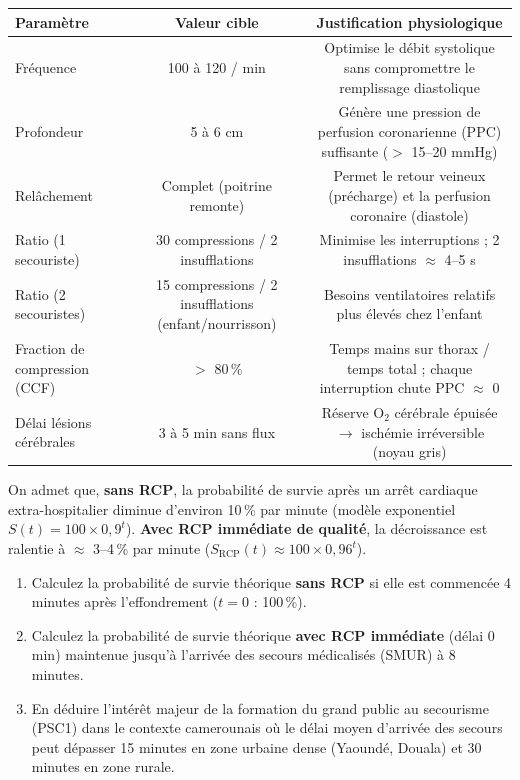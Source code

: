 \documentclass[11pt]{article}
\begin{document}
\begin{aretenir}
\begin{center}
\begin{tabular}{|l|c|c|}
\hline
\textbf{Paramètre} & \textbf{Valeur cible} & \textbf{Justification physiologique} \\
\hline
Fréquence & 100 à 120 / min & Optimise le débit systolique sans compromettre le remplissage diastolique \\
\hline
Profondeur & 5 à 6 cm & Génère une pression de perfusion coronarienne (PPC) suffisante ($>$ 15--20 mmHg) \\
\hline
Relâchement & Complet (poitrine remonte) & Permet le retour veineux (précharge) et la perfusion coronaire (diastole) \\
\hline
Ratio (1 secouriste) & 30 compressions / 2 insufflations & Minimise les interruptions ; 2 insufflations $\approx$ 4--5 s \\
\hline
Ratio (2 secouristes) & 15 compressions / 2 insufflations (enfant/nourrisson) & Besoins ventilatoires relatifs plus élevés chez l'enfant \\
\hline
Fraction de compression (CCF) & $>$ 80\,\% & Temps mains sur thorax / temps total ; chaque interruption chute PPC $\approx$ 0 \\
\hline
Délai lésions cérébrales & 3 à 5 min sans flux & Réserve O$_2$ cérébrale épuisée $\rightarrow$ ischémie irréversible (noyau gris) \\
\hline
\end{tabular}
\end{center}
\end{aretenir}

\begin{exercice}
On admet que, \textbf{sans RCP}, la probabilité de survie après un arrêt cardiaque extra-hospitalier diminue d'environ 10\,\% par minute (modèle exponentiel $S(t) = 100 \times 0,9^t$). \textbf{Avec RCP immédiate de qualité}, la décroissance est ralentie à $\approx$ 3--4\,\% par minute ($S_{\text{RCP}}(t) \approx 100 \times 0,96^t$).
\begin{enumerate}
    \item Calculez la probabilité de survie théorique \textbf{sans RCP} si elle est commencée 4 minutes après l'effondrement ($t=0$ : 100\,\%).
    \item Calculez la probabilité de survie théorique \textbf{avec RCP immédiate} (délai 0 min) maintenue jusqu'à l'arrivée des secours médicalisés (SMUR) à 8 minutes.
    \item En déduire l'intérêt majeur de la formation du grand public au secourisme (PSC1) dans le contexte camerounais où le délai moyen d'arrivée des secours peut dépasser 15 minutes en zone urbaine dense (Yaoundé, Douala) et 30 minutes en zone rurale.
\end{enumerate}
\end{exercice}
\end{document}
